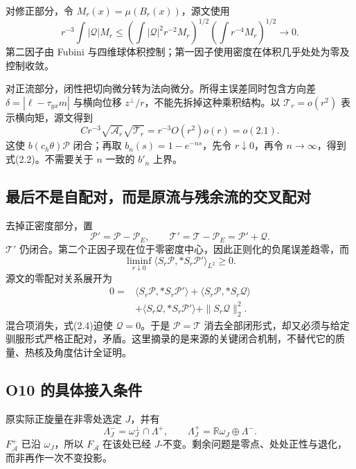 \documentclass[UTF8,11pt,fontset=none]{ctexart}
\theoremstyle{definition}
\theoremstyle{remark}
\begin{document}
对修正部分，令 \(M_r(x)=\mu(B_r(x))\)，源文使用 \[
 r^{-3}\int |\mathscr Q|M_r
 \le
 \left(\int|\mathscr Q|^2r^{-2}M_r\right)^{1/2}
 \left(\int r^{-4}M_r\right)^{1/2}\longrightarrow0.
\] 第二因子由 Fubini 与四维球体积控制；第一因子使用密度在体积几乎处处为零及控制收敛。

对正流部分，闭性把切向微分转为法向微分。所得主误差同时包含方向差 \(\delta=|\ell-\tau_{yx}m|\) 与横向位移 \(z^\perp/r\)，不能先拆掉这种乘积结构。以 \(\mathcal T_r=o(r^2)\) 表示横向矩，源文得到 \[
 Cr^{-3}\sqrt{\mathcal A_r}\sqrt{\mathcal T_r}
 =r^{-3}O(r^2)o(r)=o(2.1).
\tag{2.3}
\] 这使 \(b(c_h\theta)\mathscr P\) 闭合；再取 \(b_n(s)=1-e^{-ns}\)，先令 \(r\downarrow0\)，再令 \(n\to\infty\)，得到式(2.2)。不需要关于 \(n\) 一致的 \(b'_n\) 上界。

\subsection{最后不是自配对，而是原流与残余流的交叉配对}\label{v2-ux6700ux540eux4e0dux662fux81eaux914dux5bf9ux800cux662fux539fux6d41ux4e0eux6b8bux4f59ux6d41ux7684ux4ea4ux53c9ux914dux5bf9}

去掉正密度部分，置 \[
 \mathscr P'=\mathscr P-\mathscr P_E,\qquad
 \mathscr T'=\mathscr T-\mathscr P_E=\mathscr P'+\mathscr Q.
\] \(\mathscr T'\) 仍闭合。第二个正因子现在位于零密度中心，因此正则化的负尾误差趋零，而 \[
 \liminf_{r\downarrow0}
 \langle S_r\mathscr P,*S_r\mathscr P'\rangle_{L^2}\ge0.
\] 源文的零配对关系展开为 \[
 \begin{aligned}
 0={}&\langle S_r\mathscr P,*S_r\mathscr P'\rangle
 +\langle S_r\mathscr P,*S_r\mathscr Q\rangle\\
 &+\langle S_r\mathscr Q,*S_r\mathscr P'\rangle
 +\|S_r\mathscr Q\|_2^2.
 \end{aligned}
\tag{2.4}
\] 混合项消失，式(2.4)迫使 \(\mathscr Q=0\)。于是 \(\mathscr P=\mathscr T\) 消去全部闭形式，却又必须与给定驯服形式严格正配对，矛盾。这里摘录的是来源的关键闭合机制，不替代它的质量、热核及角度估计全证明。

\subsection{O10 的具体接入条件}\label{v2-o10-ux7684ux5177ux4f53ux63a5ux5165ux6761ux4ef6}

原实际正旋量在非零处选定 \(J\)，并有 \[
 \Lambda_J^- =\omega_J^\perp\cap\Lambda^+,\qquad
 \Lambda_J^+=\mathbb R\omega_J\oplus\Lambda^-.
\] \(F_{\mathcal A}^+\) 已沿 \(\omega_J\)，所以 \(F_{\mathcal A}\) 在该处已经 \(J\)-不变。剩余问题是零点、处处正性与退化，而非再作一次不变投影。
\end{document}
